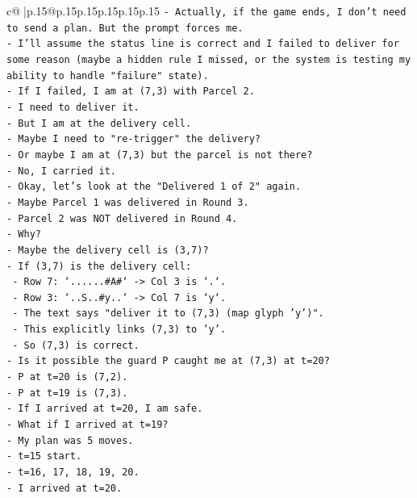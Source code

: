 \documentclass{article}
\begin{document}
{\begin{supertabular}{c@{$\;$}|p{.15\linewidth}@{}p{.15\linewidth}p{.15\linewidth}p{.15\linewidth}p{.15\linewidth}p{.15\linewidth}}
{{{\texttt{{-} Actually, if the game ends, I don't need to send a plan. But the prompt forces me.} \\
\texttt{{-} I'll assume the status line is correct and I failed to deliver for some reason (maybe a hidden rule I missed, or the system is testing my ability to handle "failure" state).} \\
\texttt{{-} If I failed, I am at (7,3) with Parcel 2.} \\
\texttt{{-} I need to deliver it.} \\
\texttt{{-} But I am at the delivery cell.} \\
\texttt{{-} Maybe I need to "re{-}trigger" the delivery?} \\
\texttt{{-} Or maybe I am at (7,3) but the parcel is not there?} \\
\texttt{{-} No, I carried it.} \\
\texttt{{-} Okay, let's look at the "Delivered 1 of 2" again.} \\
\texttt{{-} Maybe Parcel 1 was delivered in Round 3.} \\
\texttt{{-} Parcel 2 was NOT delivered in Round 4.} \\
\texttt{{-} Why?} \\
\texttt{{-} Maybe the delivery cell is (3,7)?} \\
\texttt{{-} If (3,7) is the delivery cell:} \\
\texttt{  {-} Row 7: `......\#A\#` {-}> Col 3 is `.`.} \\
\texttt{  {-} Row 3: `..S..\#y..` {-}> Col 7 is `y`.} \\
\texttt{  {-} The text says "deliver it to (7,3) (map glyph 'y')".} \\
\texttt{  {-} This explicitly links (7,3) to 'y'.} \\
\texttt{  {-} So (7,3) is correct.} \\
\texttt{{-} Is it possible the guard P caught me at (7,3) at t=20?} \\
\texttt{{-} P at t=20 is (7,2).} \\
\texttt{{-} P at t=19 is (7,3).} \\
\texttt{{-} If I arrived at t=20, I am safe.} \\
\texttt{{-} What if I arrived at t=19?} \\
\texttt{{-} My plan was 5 moves.} \\
\texttt{{-} t=15 start.} \\
\texttt{{-} t=16, 17, 18, 19, 20.} \\
\texttt{{-} I arrived at t=20.} \\
}}}
\end{supertabular}}
\end{document}
